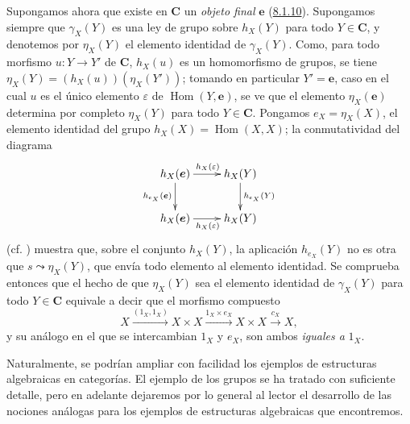\begin{env}[8.2.7]
\label{0.8.2.7-fr}
Supongamos ahora que existe en $\boldsymbol{C}$ un \emph{objeto final} $\boldsymbol{e}$ (\hyperref[0.8.1.10-fr]{8.1.10}). Supongamos siempre que $\gamma_X(Y)$ es una ley de grupo sobre $h_X(Y)$ para todo $Y\in \boldsymbol{C}$, y denotemos por $\eta_X(Y)$ el elemento identidad de $\gamma_X(Y)$.
Como, para todo morfismo $u:Y\to Y'$ de $\boldsymbol{C}$, $h_X(u)$ es un homomorfismo de grupos, se tiene $\eta_X(Y)=(h_X(u))(\eta_X(Y'))$; tomando en particular $Y'=\boldsymbol{e}$, caso en el cual $u$ es el único elemento $\varepsilon$ de $\operatorname{Hom}(Y,\boldsymbol{e})$, se ve que el elemento $\eta_X(\boldsymbol{e})$ determina por completo $\eta_X(Y)$ para todo $Y\in \boldsymbol{C}$.
Pongamos $e_X=\eta_X(X)$, el elemento identidad del grupo $h_X(X)=\operatorname{Hom}(X,X)$; la conmutatividad del diagrama
\[
  \xymatrix{
    h_X(\boldsymbol{e})\ar[r]^{h_X(\varepsilon)}\ar[d]_{h_{e_X}(\boldsymbol{e})} &
    h_X(Y)\ar[d]^{h_{e_X}(Y)}\\
    h_X(\boldsymbol{e})\ar[r]_{h_X(\varepsilon)} & h_X(Y)
  }
\]
(cf. ) muestra que, sobre el conjunto $h_X(Y)$, la aplicación $h_{e_X}(Y)$ no es otra que
$s\leadsto\eta_X(Y)$, que envía todo elemento al elemento identidad.
Se comprueba entonces que el hecho de que $\eta_X(Y)$ sea el elemento identidad de $\gamma_X(Y)$ para todo $Y\in \boldsymbol{C}$ equivale a decir que el morfismo compuesto
\[
  X\xrightarrow{(1_X,1_X)}X\times X
  \xrightarrow{1_X\times e_X}X\times X\xrightarrow{c_X}X,
\]
y su análogo en el que se intercambian $1_X$ y $e_X$, son ambos \emph{iguales a} $1_X$.
\end{env}

\begin{env}[8.2.8]
\label{0.8.2.8}
\label{0.8.2.8-fr}
Naturalmente, se podrían ampliar con facilidad los ejemplos de estructuras algebraicas en categorías.
El ejemplo de los grupos se ha tratado con suficiente detalle, pero en adelante dejaremos por lo general al lector el desarrollo de las nociones análogas para los ejemplos de estructuras algebraicas que encontremos.
\end{env}
